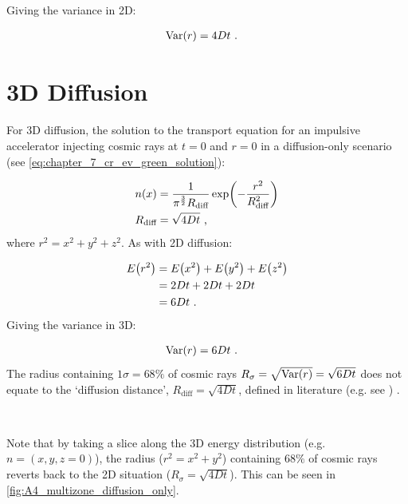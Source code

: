 \noindent Giving the variance in 2D:

\begin{equation}
    \begin{aligned}
        \mathrm{Var}\qty(r)&=4Dt\text{ .} 
    \end{aligned}
\end{equation}

\section{3D Diffusion}

For 3D diffusion, the solution to the transport equation for an impulsive accelerator injecting cosmic rays at $t=0$ and $r=0$ in a diffusion-only scenario (see \autoref{eq:chapter_7_cr_ev_green_solution}):

\begin{equation}
    \begin{aligned}
        n\qty(x)&=\frac{1}{\pi^{\frac{3}{2}} R_\text{diff}}\exp(-\frac{r^2}{R_\text{diff}^2}) \\
        R_\text{diff}&=\sqrt{4Dt}\text{ ,} 
    \end{aligned}
\end{equation}
\noindent where $r^2=x^2+y^2+z^2$. As with 2D diffusion:

\begin{equation}
    \begin{aligned}
        E\qty(r^2)&=E\qty(x^2)+E\qty(y^2)+E\qty(z^2) \\
        &= 2Dt + 2Dt + 2Dt \\
        &=6Dt\text{ .} 
    \end{aligned}
\end{equation}
\noindent Giving the variance in 3D:

\begin{equation}
    \begin{aligned}
        \mathrm{Var}\qty(r)&=6Dt\text{ .} 
    \end{aligned}
\end{equation}
\noindent The radius containing $1\sigma=68\%$ of cosmic rays $R_{\sigma}=\sqrt{\mathrm{Var}\qty(r)}=\sqrt{6Dt}$ does not equate to the `diffusion distance', $R_\text{diff}=\sqrt{4Dt}$, defined in literature (e.g. see \cite{1995PhRvD..52.3265A}) .
\par~\par 
Note that by taking a slice along the 3D energy distribution (e.g. $n=(x,y,z=0)$), the radius ($r^2=x^2+y^2$) containing $68\%$ of cosmic rays reverts back to the 2D situation ($R_\sigma=\sqrt{4Dt}$). This can be seen in \autoref{fig:A4_multizone_diffusion_only}.


